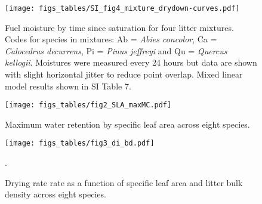 \documentclass[letterpaper]{article}
\begin{document}
\begin{figure}[H]
  \centering
\texttt{[image: figs\_tables/SI\_fig4\_mixture\_drydown-curves.pdf]}
\caption{Fuel moisture by time since saturation for four litter mixtures.  Codes for species in mixtures: Ab = \emph{Abies concolor}, Ca = \emph{Calocedrus decurrens}, Pi = \emph{Pinus jeffreyi} and Qu = \emph{Quercus kellogii}. Moistures were measured every 24 hours but data are shown with slight horizontal jitter to reduce point overlap. Mixed linear model results shown in SI Table 7.}
  \label{SI_fig4}
\end{figure}

\begin{figure}[H]
  \centering
\texttt{[image: figs\_tables/fig2\_SLA\_maxMC.pdf]}
\caption{Maximum water retention by specific leaf area across eight species.
}
  \label{fig:maxmc-di}
\end{figure}

\begin{figure}[H]
  \centering
\texttt{[image: figs\_tables/fig3\_di\_bd.pdf]}
\caption{Drying rate rate as a function of specific leaf area and litter bulk
  density across eight species.
}.
  \label{fig:bd-di}
\end{figure}
\end{document}
